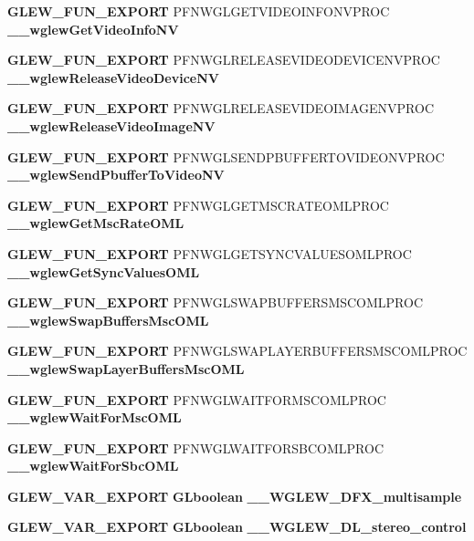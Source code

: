 \begin{DoxyCompactItemize}
\item 
{\bf G\+L\+E\+W\+\_\+\+F\+U\+N\+\_\+\+E\+X\+P\+O\+RT} P\+F\+N\+W\+G\+L\+G\+E\+T\+V\+I\+D\+E\+O\+I\+N\+F\+O\+N\+V\+P\+R\+OC {\bf \+\_\+\+\_\+wglew\+Get\+Video\+Info\+NV}
\item 
{\bf G\+L\+E\+W\+\_\+\+F\+U\+N\+\_\+\+E\+X\+P\+O\+RT} P\+F\+N\+W\+G\+L\+R\+E\+L\+E\+A\+S\+E\+V\+I\+D\+E\+O\+D\+E\+V\+I\+C\+E\+N\+V\+P\+R\+OC {\bf \+\_\+\+\_\+wglew\+Release\+Video\+Device\+NV}
\item 
{\bf G\+L\+E\+W\+\_\+\+F\+U\+N\+\_\+\+E\+X\+P\+O\+RT} P\+F\+N\+W\+G\+L\+R\+E\+L\+E\+A\+S\+E\+V\+I\+D\+E\+O\+I\+M\+A\+G\+E\+N\+V\+P\+R\+OC {\bf \+\_\+\+\_\+wglew\+Release\+Video\+Image\+NV}
\item 
{\bf G\+L\+E\+W\+\_\+\+F\+U\+N\+\_\+\+E\+X\+P\+O\+RT} P\+F\+N\+W\+G\+L\+S\+E\+N\+D\+P\+B\+U\+F\+F\+E\+R\+T\+O\+V\+I\+D\+E\+O\+N\+V\+P\+R\+OC {\bf \+\_\+\+\_\+wglew\+Send\+Pbuffer\+To\+Video\+NV}
\item 
{\bf G\+L\+E\+W\+\_\+\+F\+U\+N\+\_\+\+E\+X\+P\+O\+RT} P\+F\+N\+W\+G\+L\+G\+E\+T\+M\+S\+C\+R\+A\+T\+E\+O\+M\+L\+P\+R\+OC {\bf \+\_\+\+\_\+wglew\+Get\+Msc\+Rate\+O\+ML}
\item 
{\bf G\+L\+E\+W\+\_\+\+F\+U\+N\+\_\+\+E\+X\+P\+O\+RT} P\+F\+N\+W\+G\+L\+G\+E\+T\+S\+Y\+N\+C\+V\+A\+L\+U\+E\+S\+O\+M\+L\+P\+R\+OC {\bf \+\_\+\+\_\+wglew\+Get\+Sync\+Values\+O\+ML}
\item 
{\bf G\+L\+E\+W\+\_\+\+F\+U\+N\+\_\+\+E\+X\+P\+O\+RT} P\+F\+N\+W\+G\+L\+S\+W\+A\+P\+B\+U\+F\+F\+E\+R\+S\+M\+S\+C\+O\+M\+L\+P\+R\+OC {\bf \+\_\+\+\_\+wglew\+Swap\+Buffers\+Msc\+O\+ML}
\item 
{\bf G\+L\+E\+W\+\_\+\+F\+U\+N\+\_\+\+E\+X\+P\+O\+RT} P\+F\+N\+W\+G\+L\+S\+W\+A\+P\+L\+A\+Y\+E\+R\+B\+U\+F\+F\+E\+R\+S\+M\+S\+C\+O\+M\+L\+P\+R\+OC {\bf \+\_\+\+\_\+wglew\+Swap\+Layer\+Buffers\+Msc\+O\+ML}
\item 
{\bf G\+L\+E\+W\+\_\+\+F\+U\+N\+\_\+\+E\+X\+P\+O\+RT} P\+F\+N\+W\+G\+L\+W\+A\+I\+T\+F\+O\+R\+M\+S\+C\+O\+M\+L\+P\+R\+OC {\bf \+\_\+\+\_\+wglew\+Wait\+For\+Msc\+O\+ML}
\item 
{\bf G\+L\+E\+W\+\_\+\+F\+U\+N\+\_\+\+E\+X\+P\+O\+RT} P\+F\+N\+W\+G\+L\+W\+A\+I\+T\+F\+O\+R\+S\+B\+C\+O\+M\+L\+P\+R\+OC {\bf \+\_\+\+\_\+wglew\+Wait\+For\+Sbc\+O\+ML}
\item 
{\bf G\+L\+E\+W\+\_\+\+V\+A\+R\+\_\+\+E\+X\+P\+O\+RT} {\bf G\+Lboolean} {\bf \+\_\+\+\_\+\+W\+G\+L\+E\+W\+\_\+D\+F\+X\+\_\+multisample}
\item 
{\bf G\+L\+E\+W\+\_\+\+V\+A\+R\+\_\+\+E\+X\+P\+O\+RT} {\bf G\+Lboolean} {\bf \+\_\+\+\_\+\+W\+G\+L\+E\+W\+\_\+D\+L\+\_\+stereo\+\_\+control}

\end{DoxyCompactItemize}

